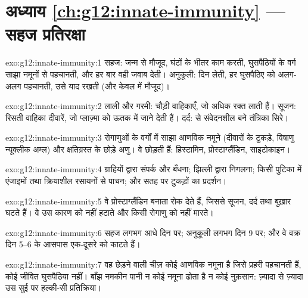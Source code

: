 \section*{अध्याय \ref{ch:g12:innate-immunity} --- सहज प्रतिरक्षा}

\begin{solution}{exo:g12:innate-immunity:1}
सहज: जन्म से मौजूद, घंटों के भीतर काम करती, घुसपैठियों के वर्ग साझा नमूनों
से पहचानती, और हर बार वही जवाब देती। अनुकूली: दिन लेती, हर घुसपैठिए को
अलग-अलग पहचानती, उसे याद रखती (और केवल  में मौजूद)।
\end{solution}

\begin{solution}{exo:g12:innate-immunity:2}
लाली और गरमी: चौड़ी वाहिकाएँ, जो अधिक रक्त लाती हैं। सूजन: रिसती वाहिका
दीवारें, जो प्लाज़्मा को ऊतक में जाने देती हैं। दर्द:  से
संवेदनशील बने तंत्रिका सिरे।
\end{solution}

\begin{solution}{exo:g12:innate-immunity:3}
रोगाणुओं के वर्गों में साझा आणविक नमूने (दीवारों के टुकड़े, विषाणु न्यूक्लीक
अम्ल) और क्षतिग्रस्त  के छोड़े अणु। वे  छोड़ती हैं:
हिस्टामिन, प्रोस्टाग्लैंडिन, साइटोकाइन।
\end{solution}

\begin{solution}{exo:g12:innate-immunity:4}
ग्राहियों द्वारा संपर्क और बँधना; झिल्ली द्वारा निगलना; किसी पुटिका में
एंजाइमों तथा क्रियाशील रसायनों से पाचन; और सतह पर  टुकड़ों का
प्रदर्शन।
\end{solution}

\begin{solution}{exo:g12:innate-immunity:5}
वे प्रोस्टाग्लैंडिन बनाता  रोक देते हैं, जिससे सूजन, दर्द तथा बुख़ार
घटते हैं। वे उस कारण को नहीं हटाते और किसी रोगाणु को नहीं मारते।
\end{solution}

\begin{solution}{exo:g12:innate-immunity:6}
सहज लगभग आधे दिन पर; अनुकूली लगभग दिन 9 पर; और वे वक्र दिन 5--6 के आसपास
एक-दूसरे को काटते हैं।
\end{solution}

\begin{solution}{exo:g12:innate-immunity:7}
वह छेड़ने वाली चीज़ कोई आणविक नमूना है जिसे प्रहरी  पहचानती हैं,
कोई जीवित घुसपैठिया नहीं। बाँझ नमकीन पानी न कोई नमूना ढोता है न कोई नुक़सान:
ज़्यादा से ज़्यादा उस सुई पर हल्की-सी प्रतिक्रिया।
\end{solution}

